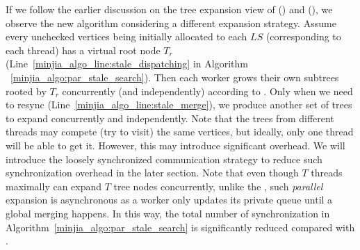 If we follow the earlier discussion on the tree expansion view of \SeqFullName (\SeqShortName)  and \Hammer (\Hammer), we observe the new algorithm \Hammer considering a different expansion strategy. 
Assume every unchecked vertices being initially allocated to each $LS$ (corresponding to each thread) has a virtual root node $T_r$ (Line~\ref{minjia_algo_line:stale_dispatching} in Algorithm ~\ref{minjia_algo:par_stale_search}). Then each worker grows their own subtrees rooted by $T_r$ concurrently (and independently) according to \SeqShortName.  
Only when we need to resync (Line~\ref{minjia_algo_line:stale_merge}), we produce another set of trees to expand concurrently and independently. 
Note that the trees from different threads may compete (try to visit) the same vertices, but ideally, only one thread will be able to get it. However, this may introduce significant overhead. We will introduce the loosely synchronized communication strategy to reduce such synchronization overhead in the later section. 
Note that even though $T$ threads maximally can expand $T$ tree nodes concurrently, unlike the \Hammer, such {\em parallel} expansion is asynchronous as a worker only updates its private queue until a global merging happens. 
In this way, the total number of synchronization in Algorithm~\ref{minjia_algo:par_stale_search} is significantly reduced compared with \Hammer.

